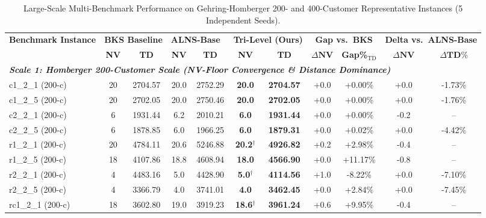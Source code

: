 \documentclass{ieeeaccess}
\begin{document}
\begin{table}[!t]
\caption{Large-Scale Multi-Benchmark Performance on Gehring-Homberger 200- and 400-Customer Representative Instances (5 Independent Seeds).}
\label{tab:homberger_scale_benchmark}
\centering
\scriptsize
\setlength{\tabcolsep}{2.0pt}
\begin{tabular*}{\textwidth}{@{\extracolsep{\fill}} l cc cc cc cc cc @{}}
\toprule
\multirow{2}{*}{\textbf{Benchmark Instance}} & \multicolumn{2}{c}{\textbf{BKS Baseline}} & \multicolumn{2}{c}{\textbf{ALNS-Base~\cite{Ropke2006}}} & \multicolumn{2}{c}{\textbf{Tri-Level (Ours)}} & \multicolumn{2}{c}{\textbf{Gap vs.\ BKS}} & \multicolumn{2}{c}{\textbf{Delta vs.\ ALNS-Base}} \\
\cmidrule(lr){2-3} \cmidrule(lr){4-5} \cmidrule(lr){6-7} \cmidrule(lr){8-9} \cmidrule(lr){10-11}
 & \textbf{NV} & \textbf{TD} & \textbf{NV} & \textbf{TD} & \textbf{NV} & \textbf{TD} & $\Delta\textbf{NV}$ & \textbf{Gap\%}$_{\text{TD}}$ & $\Delta\textbf{NV}$ & $\Delta\textbf{TD}\%$ \\
\midrule
\multicolumn{11}{l}{\textit{\textbf{Scale 1: Homberger 200-Customer Scale (NV-Floor Convergence \& Distance Dominance)}}} \\
c1\_2\_1 (200-c) & 20 & 2704.57 & 20.0 & 2752.29 & \textbf{20.0} & \textbf{2704.57} & +0.0 & +0.00\% & +0.0 & -1.73\% \\
c1\_2\_5 (200-c) & 20 & 2702.05 & 20.0 & 2750.46 & \textbf{20.0} & \textbf{2702.05} & +0.0 & +0.00\% & +0.0 & -1.76\% \\
c2\_2\_1 (200-c) & 6 & 1931.44 & 6.2 & 2010.21 & \textbf{6.0} & \textbf{1931.44} & +0.0 & +0.00\% & -0.2 & -- \\
c2\_2\_5 (200-c) & 6 & 1878.85 & 6.0 & 1966.25 & \textbf{6.0} & \textbf{1879.31} & +0.0 & +0.02\% & +0.0 & -4.42\% \\
r1\_2\_1 (200-c) & 20 & 4784.11 & 20.6 & 5246.88 & \textbf{20.2}$^\dagger$ & \textbf{4926.82} & +0.2 & +2.98\% & -0.4 & -- \\
r1\_2\_5 (200-c) & 18 & 4107.86 & 18.8 & 4608.94 & \textbf{18.0} & \textbf{4566.90} & +0.0 & +11.17\% & -0.8 & -- \\
r2\_2\_1 (200-c) & 4 & 4483.16 & 5.0 & 4428.90 & \textbf{5.0}$^\dagger$ & \textbf{4114.56} & +1.0 & -8.22\% & +0.0 & -7.10\% \\
r2\_2\_5 (200-c) & 4 & 3366.79 & 4.0 & 3741.01 & \textbf{4.0} & \textbf{3462.45} & +0.0 & +2.84\% & +0.0 & -7.45\% \\
rc1\_2\_1 (200-c) & 18 & 3602.80 & 19.0 & 3919.23 & \textbf{18.6}$^\dagger$ & \textbf{3961.24} & +0.6 & +9.95\% & -0.4 & -- \\

\end{tabular*}
\end{table}
\end{document}
